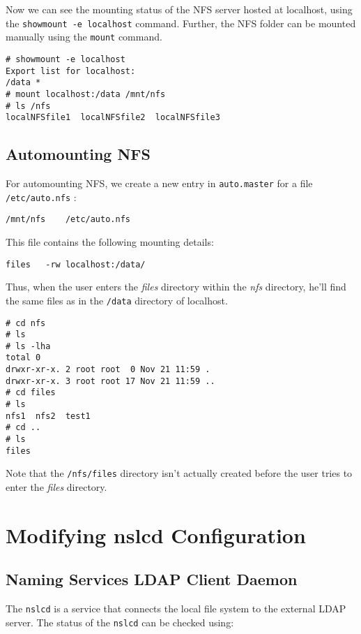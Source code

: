 Now we can see the mounting status of the NFS server hosted at localhost, using the \verb|showmount -e localhost| command. Further, the NFS folder can be mounted manually using the \verb|mount| command. 

\vspace{-15pt}
\begin{verbatim}
# showmount -e localhost
Export list for localhost:
/data *
# mount localhost:/data /mnt/nfs
# ls /nfs
localNFSfile1  localNFSfile2  localNFSfile3
\end{verbatim}

\subsection{Automounting NFS}
For automounting NFS, we create a new entry in \verb|auto.master| for a file \verb|/etc/auto.nfs| :

\vspace{-15pt}
\begin{verbatim}
/mnt/nfs	/etc/auto.nfs
\end{verbatim}
\vspace{-10pt}

\noindent
This file contains the following mounting details:	
\vspace{-15pt}
\begin{verbatim}
files	-rw	localhost:/data/
\end{verbatim}
\vspace{-10pt}

\noindent Thus, when the user enters the \textit{files} directory within the \textit{nfs} directory, he'll find the same files as in the \verb|/data| directory of localhost. 

\vspace{-15pt}
\begin{verbatim}
# cd nfs
# ls
# ls -lha
total 0
drwxr-xr-x. 2 root root  0 Nov 21 11:59 .
drwxr-xr-x. 3 root root 17 Nov 21 11:59 ..
# cd files
# ls
nfs1  nfs2  test1
# cd ..
# ls
files
\end{verbatim}

\noindent	Note that the \verb|/nfs/files| directory isn't actually created before the user tries to enter the \textit{files} directory. 

\section{Modifying nslcd Configuration}
\subsection{Naming Services LDAP Client Daemon}
The \verb|nslcd| is a service that connects the local file system to the external LDAP server. The status of the \verb|nslcd| can be checked using:


